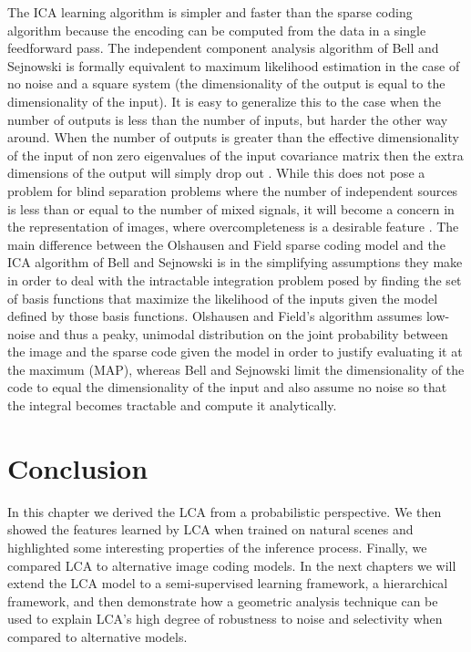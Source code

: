 The ICA learning algorithm is simpler and faster than the sparse coding algorithm because the encoding can be computed from the data in a single feedforward pass. The independent component analysis algorithm of Bell and Sejnowski \citeyearpar{bell1997independent} is formally equivalent to maximum likelihood estimation in the case of no noise and a square system (the dimensionality of the output is equal to the dimensionality of the input). It is easy to generalize this to the case when the number of outputs is less than the number of inputs, but harder the other way around. When the number of outputs is greater than the effective dimensionality of the input of non zero eigenvalues of the input covariance matrix then the extra dimensions of the output will simply drop out \parencite{livezey2016degeneracy, le2011ica}. While this does not pose a problem for blind separation problems where the number of independent sources is less than or equal to the number of mixed signals, it will become a concern in the representation of images, where overcompleteness is a desirable feature \parencite{simoncelli1991shiftable}. The main difference between the Olshausen and Field \citeyearpar{olshausen1996emergence} sparse coding model and the ICA algorithm of Bell and Sejnowski \citeyearpar{bell1997independent} is in the simplifying assumptions they make in order to deal with the intractable integration problem posed by finding the set of basis functions that maximize the likelihood of the inputs given the model defined by those basis functions. Olshausen and Field’s algorithm assumes low-noise and thus a peaky, unimodal distribution on the joint probability between the image and the sparse code given the model in order to justify evaluating it at the maximum (MAP), whereas Bell and Sejnowski limit the dimensionality of the code to equal the dimensionality of the input and also assume no noise so that the integral becomes tractable and compute it analytically.


\section{Conclusion}
In this chapter we derived the LCA from a probabilistic perspective. We then showed the features learned by LCA when trained on natural scenes and highlighted some interesting properties of the inference process. Finally, we compared LCA to alternative image coding models. In the next chapters we will extend the LCA model to a semi-supervised learning framework, a hierarchical framework, and then demonstrate how a geometric analysis technique can be used to explain LCA's high degree of robustness to noise and selectivity when compared to alternative models.
